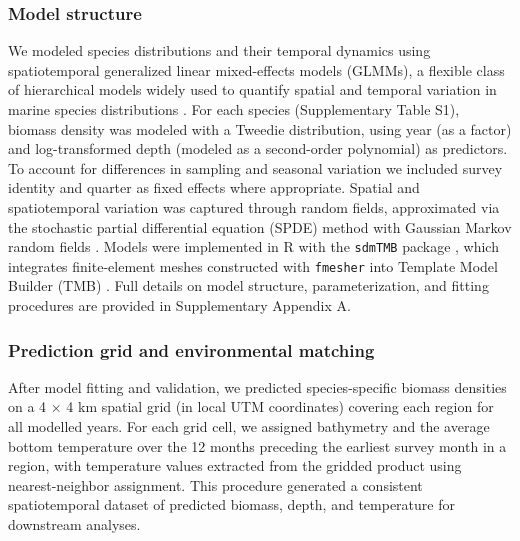 \documentclass[9pt,twocolumn,twoside]{pnas-new}
\begin{document}
{\subsubsection*{Model structure} 
We modeled species distributions and their temporal dynamics using spatiotemporal generalized linear mixed-effects models (GLMMs), a flexible class of hierarchical models widely used to quantify spatial and temporal variation in marine species distributions \citep{thorson_geostatistical_2015, thorson_model-based_2016}. For each species (Supplementary Table S1), biomass density was modeled with a Tweedie distribution, using year (as a factor) and log-transformed depth (modeled as a second-order polynomial) as predictors. To account for differences in sampling and seasonal variation we included survey identity and quarter as fixed effects where appropriate. Spatial and spatiotemporal variation was captured through random fields, approximated via the stochastic partial differential equation (SPDE) method with Gaussian Markov random fields \citep{lindgren_explicit_2011}. Models were implemented in R with the \texttt{sdmTMB} package \citep{sdmTMB2025}, which integrates finite-element meshes constructed with \texttt{fmesher} \citep{lindgren_fmesher_2025} into Template Model Builder (TMB) \citep{kristensen_tmb_2016}. Full details on model structure, parameterization, and fitting procedures are provided in Supplementary Appendix A.

\subsubsection*{Prediction grid and environmental matching} 
After model fitting and validation, we predicted species-specific biomass densities on a 4 × 4 km spatial
grid (in local UTM coordinates) covering each region for all modelled years. For each grid cell, we assigned bathymetry and the average bottom temperature over the 12 months preceding the earliest survey month in a region, with temperature values extracted from the gridded product using nearest-neighbor assignment. This procedure generated a consistent spatiotemporal dataset of predicted biomass, depth, and temperature for downstream analyses.

}
\end{document}
